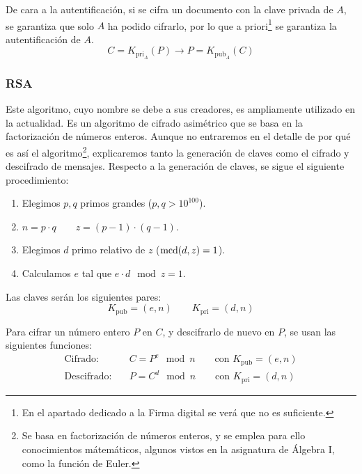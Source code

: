 De cara a la autentificación, si se cifra un documento con la clave privada de $A$, se garantiza que solo $A$ ha podido cifrarlo, por lo que a priori\footnote{En el apartado dedicado a la Firma digital se verá que no es suficiente.} se garantiza la autentificación de $A$.
\begin{equation*}
    C = K_{\text{pri}_A}(P) \longrightarrow P = K_{\text{pub}_A}(C)
\end{equation*}

\subsubsection{\acrshort{RSA}}
Este algoritmo, cuyo nombre se debe a sus creadores, es ampliamente utilizado en la actualidad. Es un algoritmo de cifrado asimétrico que se basa en la factorización de números enteros.
Aunque no entraremos en el detalle de por qué es así el algoritmo\footnote{Se basa en factorización de números enteros, y se emplea para ello conocimientos mátemáticos, algunos vistos en la asignatura de Álgebra I, como la función de Euler.}, explicaremos tanto la generación de claves como el cifrado y descifrado de mensajes. Respecto a la generación de claves, se sigue el siguiente procedimiento:
\begin{enumerate}
    \item Elegimos $p,q$ primos grandes ($p,q>10^{100}$).
    \item $n = p\cdot q\qquad z = (p-1)\cdot(q-1)$.
    \item Elegimos $d$ primo relativo de $z$ ($\operatorname{mcd}(d,z)=1$).
    \item Calculamos $e$ tal que $e\cdot d \mod z = 1$.
\end{enumerate}
Las claves serán los siguientes pares:
\begin{equation*}
    K_{\text{pub}} = (e,n)\qquad K_{\text{pri}} = (d,n)
\end{equation*}

Para cifrar un número entero $P$ en $C$, y descifrarlo de nuevo en $P$, se usan las siguientes funciones:
\begin{align*}
    \text{Cifrado:} &\quad C = P^e \mod n\qquad \text{con } K_{\text{pub}} = (e,n)\\
    \text{Descifrado:} &\quad P = C^d \mod n \qquad \text{con } K_{\text{pri}} = (d,n)
\end{align*}

